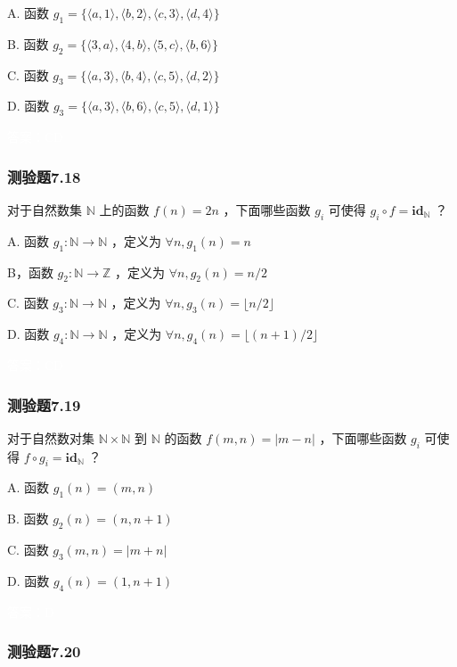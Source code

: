 \documentclass[UTF8, heading=true]{ctexart}
\begin{document}
A. 函数 $g_1=\{\langle a, 1\rangle,\langle b, 2\rangle,\langle c, 3\rangle,\langle d, 4\rangle\}$

B. 函数 $g_2=\{\langle 3, a\rangle,\langle 4, b\rangle,\langle 5, c\rangle,\langle b, 6\rangle\}$

C. 函数 $g_3=\{\langle a, 3\rangle,\langle b, 4\rangle,\langle c, 5\rangle,\langle d, 2\rangle\}$

D.  函数 $g_3=\{\langle a, 3\rangle,\langle b, 6\rangle,\langle c, 5\rangle,\langle d, 1\rangle\}$


\textcolor{white}{答案：CD}

\subsubsection{测验题7.18}

对于自然数集 $\mathbb{N}$ 上的函数 $f(n)=2 n$ ，下面哪些函数 $g_i$ 可使得 $g_i \circ f=\mathbf{i d}_{\mathbb{N}}$ ？

A. 函数 $g_1: \mathbb{N} \rightarrow \mathbb{N}$ ，定义为 $\forall n, g_1(n)=n$

B，函数 $g_2: \mathbb{N} \rightarrow \mathbb{Z}$ ，定义为 $\forall n, g_2(n)=n / 2$

C. 函数 $g_3: \mathbb{N} \rightarrow \mathbb{N}$ ，定义为 $\forall n, g_3(n)=\lfloor n / 2\rfloor$

D.  函数 $g_4: \mathbb{N} \rightarrow \mathbb{N}$ ，定义为 $\forall n, g_4(n)=\lfloor(n+1) / 2\rfloor$


\textcolor{white}{答案：CD}

\subsubsection{测验题7.19}

对于自然数对集 $\mathbb{N} \times \mathbb{N}$ 到 $\mathbb{N}$ 的函数 $f(m, n)=|m-n|$ ，下面哪些函数 $g_i$ 可使得 $f \circ g_i=\mathbf{i d}_{\mathbb{N}}$ ？

A. 函数 $g_1(n)=(m, n)$

B. 函数 $g_2(n)=(n, n+1)$

C. 函数 $g_3(m, n)=|m+n|$

D.  函数 $g_4(n)=(1, n+1)$


\textcolor{white}{答案：D}

\subsubsection{测验题7.20}
\end{document}
